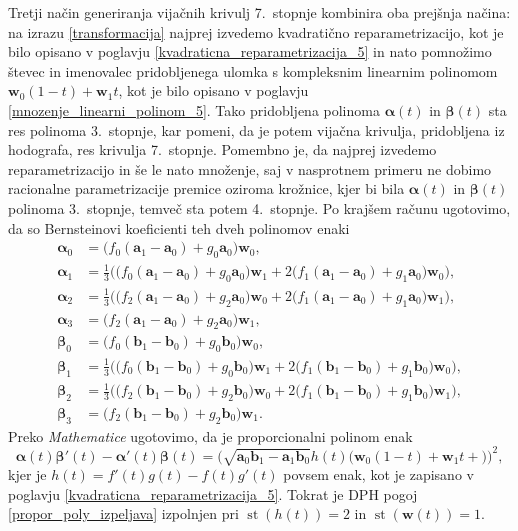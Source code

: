 \documentclass[12pt,a4paper,twoside]{article}
\theoremstyle{definition} %
\theoremstyle{plain} %
\numberwithin{equation}{section}  %
\newcommand{\aV}{\mathbf{a}}
\newcommand{\bV}{\mathbf{b}}
\newcommand{\wV}{\mathbf{w}}
\newcommand{\balpha}{\boldsymbol \alpha}
\newcommand{\bbeta}{\boldsymbol \beta}
\DeclareMathOperator{\st}{st}
\begin{document}
Tretji način generiranja vijačnih krivulj 7.\ stopnje kombinira oba prejšnja načina: na izrazu \eqref{transformacija} najprej izvedemo kvadratično reparametrizacijo, kot je bilo opisano v poglavju \ref{kvadraticna_reparametrizacija_5} in nato pomnožimo števec in imenovalec pridobljenega ulomka s kompleksnim linearnim polinomom $\wV_0(1-t)+\wV_1t$, kot je bilo opisano v poglavju \ref{mnozenje_linearni_polinom_5}. Tako pridobljena polinoma $\balpha(t)$ in $\bbeta(t)$ sta res polinoma 3.\ stopnje, kar pomeni, da je potem vijačna krivulja, pridobljena iz hodografa, res krivulja 7.\ stopnje. Pomembno je, da najprej izvedemo reparametrizacijo in še le nato množenje, saj v nasprotnem primeru ne dobimo racionalne parametrizacije premice oziroma krožnice, kjer bi bila $\balpha(t)$ in $\bbeta(t)$ polinoma 3.\ stopnje, temveč sta potem 4.\ stopnje. Po krajšem računu ugotovimo, da so Bernsteinovi koeficienti teh dveh polinomov enaki
\begin{align}
	\balpha_0&=\big(f_0(\aV_1-\aV_0)+g_0\aV_0\big)\wV_0,\nonumber\\
	\balpha_1&=\frac{1}{3}\Big(\big(f_0(\aV_1-\aV_0)+g_0\aV_0\big)\wV_1+2\big(f_1(\aV_1-\aV_0)+g_1\aV_0\big)\wV_0\Big),\nonumber\\
	\balpha_2&=\frac{1}{3}\Big(\big(f_2(\aV_1-\aV_0)+g_2\aV_0\big)\wV_0+2\big(f_1(\aV_1-\aV_0)+g_1\aV_0\big)\wV_1\Big),\nonumber\\
	\balpha_3&=\big(f_2(\aV_1-\aV_0)+g_2\aV_0\big)\wV_1,\nonumber\\
	\bbeta_0&=\big(f_0(\bV_1-\bV_0)+g_0\bV_0\big)\wV_0,\nonumber\\
	\bbeta_1&=\frac{1}{3}\Big(\big(f_0(\bV_1-\bV_0)+g_0\bV_0\big)\wV_1+2\big(f_1(\bV_1-\bV_0)+g_1\bV_0\big)\wV_0\Big),\nonumber\\
	\bbeta_2&=\frac{1}{3}\Big(\big(f_2(\bV_1-\bV_0)+g_2\bV_0\big)\wV_0+2\big(f_1(\bV_1-\bV_0)+g_1\bV_0\big)\wV_1\Big),\nonumber\\
	\bbeta_3&=\big(f_2(\bV_1-\bV_0)+g_2\bV_0\big)\wV_1.
\end{align}
Preko \emph{Mathematice} ugotovimo, da je proporcionalni polinom enak
\begin{equation*}
	\balpha(t)\bbeta'(t)-\balpha'(t)\bbeta(t)=\big(\sqrt{\aV_0\bV_1-\aV_1\bV_0}h(t)\big(\wV_0(1-t)+\wV_1t+\big)\big)^2,
\end{equation*}
kjer je $h(t)=f'(t)g(t)-f(t)g'(t)$ povsem enak, kot je zapisano v poglavju \ref{kvadraticna_reparametrizacija_5}. Tokrat je DPH pogoj \eqref{propor_poly_izpeljava} izpolnjen pri $\st(h(t))=2$ in $\st(\wV(t))=1.$
\end{document}
